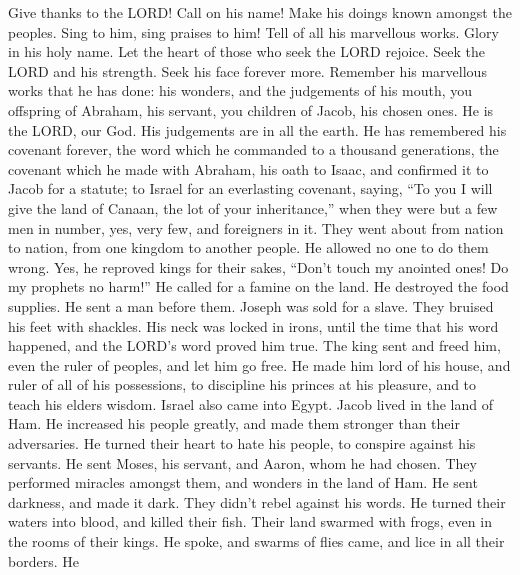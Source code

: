  Give thanks to the LORD! Call on his name! Make his doings
known amongst the peoples.  Sing to him, sing praises to
him! Tell of all his marvellous works.  Glory in his holy
name. Let the heart of those who seek the LORD rejoice. 
Seek the LORD and his strength. Seek his face forever more. 
Remember his marvellous works that he has done: his wonders, and the
judgements of his mouth,  you offspring of Abraham, his
servant, you children of Jacob, his chosen ones.  He is the
LORD, our God. His judgements are in all the earth.  He has
remembered his covenant forever, the word which he commanded to a
thousand generations,  the covenant which he made with
Abraham, his oath to Isaac,  and confirmed it to Jacob for
a statute; to Israel for an everlasting covenant,  saying,
``To you I will give the land of Canaan, the lot of your inheritance,''
 when they were but a few men in number, yes, very few, and
foreigners in it.  They went about from nation to nation,
from one kingdom to another people.  He allowed no one to
do them wrong. Yes, he reproved kings for their sakes, 
``Don't touch my anointed ones! Do my prophets no harm!'' 
He called for a famine on the land. He destroyed the food supplies.
 He sent a man before them. Joseph was sold for a slave.
 They bruised his feet with shackles. His neck was locked
in irons,  until the time that his word happened, and the
LORD's word proved him true.  The king sent and freed him,
even the ruler of peoples, and let him go free.  He made
him lord of his house, and ruler of all of his possessions,
 to discipline his princes at his pleasure, and to teach
his elders wisdom.  Israel also came into Egypt. Jacob
lived in the land of Ham.  He increased his people greatly,
and made them stronger than their adversaries.  He turned
their heart to hate his people, to conspire against his servants.
 He sent Moses, his servant, and Aaron, whom he had chosen.
 They performed miracles amongst them, and wonders in the
land of Ham.  He sent darkness, and made it dark. They
didn't rebel against his words.  He turned their waters
into blood, and killed their fish.  Their land swarmed with
frogs, even in the rooms of their kings.  He spoke, and
swarms of flies came, and lice in all their borders.  He

